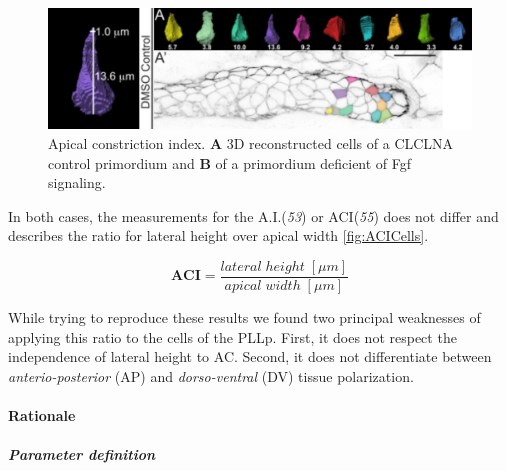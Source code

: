 \documentclass[11pt,singlespacinge,twoside]{reedthesis} %
\begin{document}
\begin{figure}

{\centering \includegraphics[width=0.75\linewidth]{figure/02-MaMo/ACI/Harding} 

}

\caption[Apical constriction index]{Apical constriction index. \textbf{A} 3D reconstructed cells of a CLCLNA control primordium and \textbf{B} of a primordium deficient of Fgf signaling.}\label{fig:ACHard}
\end{figure}
\noindent In both cases, the measurements for the A.I.(\emph{53}) or ACI(\emph{55}) does not differ and describes the ratio for lateral height over apical width \ref{fig:ACICells}.

\[\mathbf{ACI} = \frac{lateral\;height\;[\mu m]}{apical\;width\;[\mu m]}\]

\noindent While trying to reproduce these results we found two principal weaknesses of applying this ratio to the cells of the PLLp. First, it does not respect the independence of lateral height to AC. Second, it does not differentiate between \emph{anterio-posterior} (AP) and \emph{dorso-ventral} (DV) tissue polarization.

\hypertarget{rationale}{%
\paragraph{Rationale}\label{rationale}}

\hypertarget{ACI-param}{%
\subparagraph{Parameter definition}\label{ACI-param}}
\end{document}
